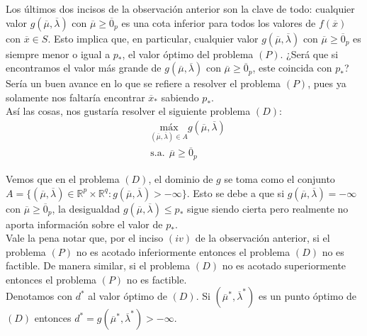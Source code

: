 \documentclass[11pt]{report}
\newcommand{\Rp}{\mathbb{R}^{p}}
\newcommand{\Rq}{\mathbb{R}^{q}}
\newcommand{\mv}{\overline{\mu}}
\newcommand{\lv}{\overline{\lambda}}
\newcommand{\x}{\overline{x}}
\newcommand{\zp}{\overline{0}_{p}}
\newcommand{\po}{p_{*}}
\newcommand{\xo}{\overline{x}_{*}}
\newcommand{\deo}{d^{*}}
\newcommand{\muo}{\overline{\mu}^{*}}
\newcommand{\lao}{\overline{\lambda}^{*}}
\newcommand{\mlo}{(\overline{\mu}^{*},\overline{\lambda}^{*})}
\begin{document}
Los últimos dos incisos de la observación anterior son la clave de todo: cualquier valor $g(\mv,\lv)$ con $\mv\geq\zp$ es una cota inferior para todos los valores de $f(\x)$ con $\x\in S$. Esto implica que, en particular, cualquier valor $g(\mv,\lv)$ con $\mv\geq\zp$ es siempre menor o igual a $\po$, el valor óptimo del problema $(P)$. ¿Será que si encontramos el valor más grande de $g(\mv,\lv)$ con $\mv\geq\zp$, este coincida con $\po$? Sería un buen avance en lo que se refiere a resolver el problema $(P)$, pues ya solamente nos faltaría encontrar $\xo$ sabiendo $\po$.\\

Así las cosas, nos gustaría resolver el siguiente problema $(D)$:
\begin{equation*}
\begin{aligned}
& \underset{(\mv,\lv)\in A}{\text{máx}} g(\mv,\lv) \\
& \text{s.a.}\ \ \mv\geq\zp
\end{aligned}
\end{equation*}

 Vemos que en el problema $(D)$, el dominio de $g$ se toma como el conjunto $A=\{(\mv,\lv)\in\Rp\times\Rq: g(\mv,\lv)>-\infty\}$. Esto se debe a que si $g(\mv,\lv)=-\infty$ con $\mv\geq\zp$, la desigualdad $g(\mv,\lv)\leq\po$ sigue siendo cierta pero realmente no aporta información sobre el valor de $\po$.\\

 Vale la pena notar que, por el inciso $(iv)$ de la observación anterior, si el problema $(P)$ no es acotado inferiormente entonces el problema $(D)$ no es factible. De manera similar, si el problema $(D)$ no es acotado superiormente entonces el problema $(P)$ no es factible.\\

 Denotamos con $\deo$ al valor óptimo de $(D)$. Si $(\muo, \lao)$ es un punto óptimo de $(D)$ entonces $\deo=g\mlo>-\infty$.\\
\end{document}
